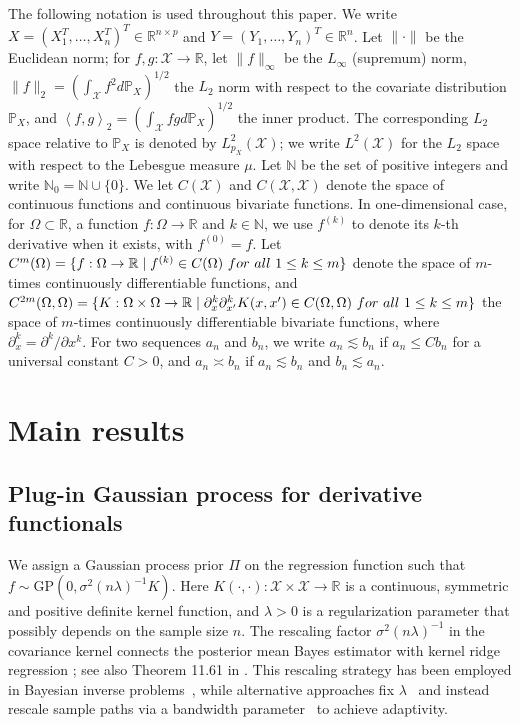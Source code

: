 \documentclass[12pt]{article}
\newcommand{\PP}{\mathbb{P}}
\newcommand{\bbR}{\mathbb{R}}
\newcommand{\mX}{\mathcal{X}}
\newcommand{\Ltwo}{L^2_{p_X}(\mX)}
\newcommand{\GP}{\mathrm{GP}}
\theoremstyle{plain}
\theoremstyle{nonitalicremark}
\begin{document}
The following notation is used throughout this paper. We write $X=(X_1^T,\ldots,X_n^T)^T\in\bbR^{n\times p}$ and $Y=(Y_1,\ldots,Y_n)^T\in \bbR^n$. Let $\|\cdot\|$ be the Euclidean norm; for $f, g: \mX \rightarrow \bbR$, let $\|f\|_\infty$ be the $L_\infty$ (supremum) norm, $\|f\|_2=(\int_\mX f^2d\PP_X)^{1/2}$ the $L_2$ norm with respect to the covariate distribution $\PP_X$, and $\left<f,g\right>_2=(\int_\mX fgd\PP_X)^{1/2}$ the inner product. The corresponding $L_2$ space relative to $\PP_X$ is denoted by $\Ltwo$; we write $L^2(\mX)$ for the $L_2$ space with respect to the Lebesgue measure $\mu$. Let  $\mathbb{N}$ be the set of positive integers and write $\mathbb{N}_0=\mathbb{N}\cup\{0\}$. We let $C(\mX)$ and $C(\mX,\mX)$ denote the space of continuous functions and continuous bivariate functions. In one-dimensional case, for $\Omega\subset\bbR$, a function $f:\Omega\rightarrow\bbR$ and $k\in\mathbb{N}$, we use $f^{(k)}$ to denote its $k$-th derivative when it exists, with $f^{(0)}=f$. Let $C^m(\Omega)=\{f:\Omega\rightarrow\bbR \mid f^{(k)}\in C(\Omega) \ {\rm for\ all\ } 1\leq k\leq m\}$ denote the space of $m$-times continuously differentiable functions, and $C^{2m}(\Omega,\Omega)=\{K:\Omega\times \Omega\rightarrow\bbR \mid \partial^k_x\partial^k_{x'}K(x,x')\in C(\Omega,\Omega) \ {\rm for\ all\ } 1\leq k\leq m\}$ the space of $m$-times continuously differentiable bivariate functions, where $\partial^k_x=\partial^k/\partial x^k$. For two sequences $a_n$ and $b_n$, we write $a_n \lesssim b_n$ if $a_n \leq C b_n$ for a universal constant $C>0$, and $a_n \asymp b_n$ if $a_n \lesssim b_n$ and $b_n \lesssim a_n$.




\section{Main results}\label{sec:main.results}

\subsection{Plug-in Gaussian process for derivative functionals} 


We assign a Gaussian process prior $\Pi$ on the regression function such that $f \sim \GP(0, \sigma^2 (n \lambda)^{-1} K)$. Here $K(\cdot,\cdot):\mX\times\mX\rightarrow \bbR$ is a continuous, symmetric and positive definite kernel function, and $\lambda>0$ is a regularization parameter that possibly depends on the sample size $n$. The rescaling factor $\sigma^2(n\lambda)^{-1}$ in the covariance kernel connects the posterior mean Bayes estimator with kernel ridge regression \citep{wahba1990spline,cucker2007learning}; see also Theorem 11.61 in \cite{ghosal2017fundamentals}. This rescaling strategy has been employed in Bayesian inverse problems~\citep{nickl2023bayesian}, while alternative approaches fix $\lambda$~\citep{van2008rates} and instead rescale sample paths via a bandwidth parameter~\citep{van2009adaptive} to achieve adaptivity.
\end{document}
